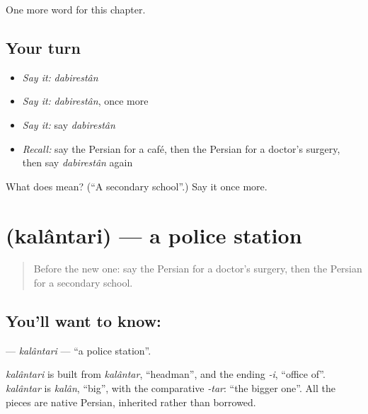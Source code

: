 \begin{grammarlens}[title={What you've built}]
One more word for this chapter.
\end{grammarlens}

\subsection*{Your turn}
\begin{itemize}
\raggedright
  \item \emph{Say it:} \emph{dabirestân}
  \item \emph{Say it:} \emph{dabirestân}, once more
  \item \emph{Say it:} say \emph{dabirestân}
  \item \emph{Recall:} say the Persian for a café, then the Persian for a doctor's surgery, then say \emph{dabirestân} again
\end{itemize}

\begin{tcolorbox}[breakable,colback=teal!4,colframe=teal!35!black,title={Before you move on}]
What does  mean? (\textquotedblleft{}A secondary school\textquotedblright{}.) Say it once more.
\end{tcolorbox}
\section[\texorpdfstring{\fa{کلانتری} (kalântari)}{کلانتری (kalântari)}]{ (kalântari) — a police station}

\label{lesson:FA-C155-kalantari}



\begin{quote}
Before the new one: say the Persian for a doctor's surgery, then the Persian for a secondary school.
\end{quote}

\subsection*{You'll want to know: }
\textbf{} — \emph{kalântari} — \textquotedblleft{}a police station\textquotedblright{}.

\begin{cousinweb}
\emph{kalântari} is built from \emph{kalântar}, \textquotedblleft{}headman\textquotedblright{}, and the ending \emph{-i}, \textquotedblleft{}office of\textquotedblright{}. \emph{kalântar} is \emph{kalân}, \textquotedblleft{}big\textquotedblright{}, with the comparative \emph{-tar}: \textquotedblleft{}the bigger one\textquotedblright{}. All the pieces are native Persian, inherited rather than borrowed.
\end{cousinweb}

